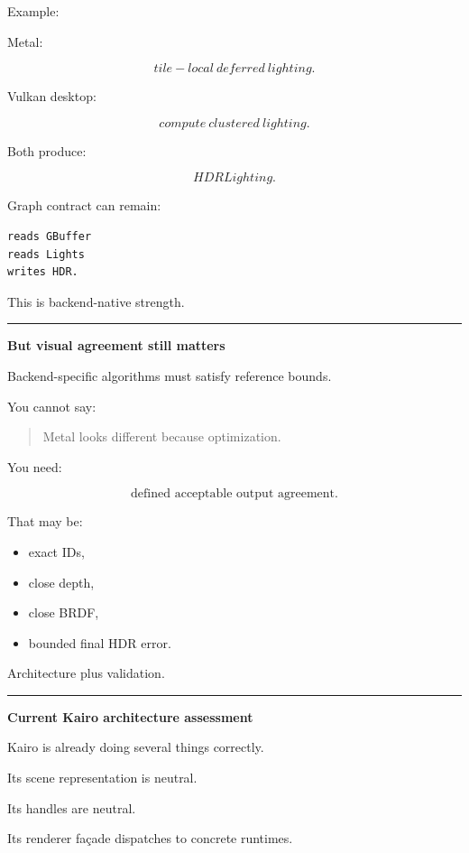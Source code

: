 Example:

Metal:

\[
tile-local\ deferred\ lighting.
\]

Vulkan desktop:

\[
compute\ clustered\ lighting.
\]

Both produce:

\[
HDRLighting.
\]

Graph contract can remain:

\begin{verbatim}
reads GBuffer
reads Lights
writes HDR.
\end{verbatim}

This is backend-native strength.

\begin{center}\rule{0.5\linewidth}{0.5pt}\end{center}

\textbf{But visual agreement still matters}

Backend-specific algorithms must satisfy reference bounds.

You cannot say:

\begin{quote}
Metal looks different because optimization.
\end{quote}

You need:

\[
\boxed{
\text{defined acceptable output agreement}.
}
\]

That may be:

\begin{itemize}
\tightlist
\item
  exact IDs,
\item
  close depth,
\item
  close BRDF,
\item
  bounded final HDR error.
\end{itemize}

Architecture plus validation.

\begin{center}\rule{0.5\linewidth}{0.5pt}\end{center}

\textbf{Current Kairo architecture assessment}

Kairo is already doing several things correctly.

Its scene representation is neutral.

Its handles are neutral.

Its renderer façade dispatches to concrete runtimes.

